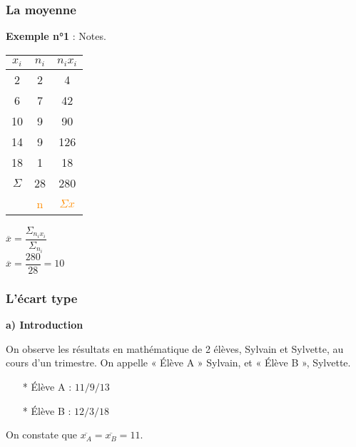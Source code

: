 \subsubsection{La moyenne}

\textbf{Exemple n°1} : Notes.

\begin{tabular}{c|c|c}
$x_i$ & $n_i$ & $n_ix_i$ \\
\hline
2 & 2 & 4	\\
6 & 7 & 42 \\
10 & 9 & 90 \\
14 & 9 & 126 \\
18 & 1 & 18 \\
\hline
$\Sigma$ & 28 & 280 \\
    & \textcolor{DarkOrange}{n} & \textcolor{DarkOrange}{$\Sigma x$} \\
\end{tabular}

\vspace{.3cm}

$\overline{x} = \dfrac{\Sigma_{n_ix_i}}{\Sigma_{n_i}} $ \\

$\overline{x} = \dfrac{280}{28} = 10 $

\newpage

\subsubsection{L'écart type}

\textbf{a) Introduction}

On observe les résultats en mathématique de 2 élèves, Sylvain et Sylvette, au cours d'un trimestre. On appelle « Élève A » Sylvain, et « Élève B », Sylvette. \\

\begin{itemize}
\item[*] Élève A : $ 11 / 9 / 13 $
\item[*] Élève B : $ 12 / 3 / 18 $
\end{itemize}

\vspace{.3cm}

On constate que $\overline{x_A} = \overline{x_B} = 11 $. \\

